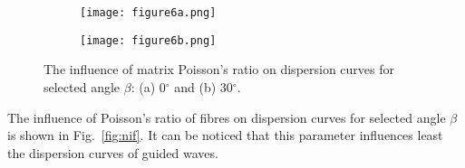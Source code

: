 \documentclass[preprint,12pt]{elsarticle}
\providecommand{\DIFaddbeginFL}{} %
\providecommand{\DIFaddendFL}{} %
\providecommand{\DIFdelbeginFL}{} %
\providecommand{\DIFdelendFL}{} %
\begin{document}
\begin{figure} [h!]
	\centering
	\DIFdelbeginFL %
\DIFdelendFL \begin{subfigure}[b]{0.49\textwidth}
		\centering
		\DIFdelbeginFL %
\DIFdelendFL \DIFaddbeginFL \texttt{[image: figure6a.png]}
		\DIFaddendFL \caption{}
		\label{fig:nim0}
	\end{subfigure}
	\hfill
	\begin{subfigure}[b]{0.49\textwidth}
		\centering
		\DIFdelbeginFL %
\DIFdelendFL \DIFaddbeginFL \texttt{[image: figure6b.png]}
		\DIFaddendFL \caption{}
		\label{fig:nim30}
	\end{subfigure}
	\caption{The influence of matrix Poisson's ratio on dispersion curves for selected angle $\beta$: (a) 0$^{\circ}$ and (b) 30$^{\circ}$.}
	\label{fig:nim}
\end{figure}

The influence of Poisson's ratio of fibres  on dispersion curves for selected angle $\beta$ is shown in Fig.~\ref{fig:nif}. It can be noticed that this parameter influences least the dispersion curves of guided waves.
\end{document}
